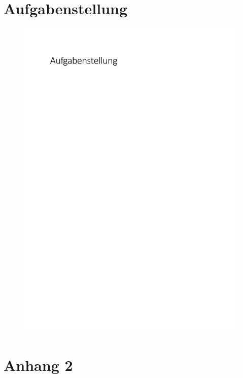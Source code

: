 \section{Aufgabenstellung}\label{sec:aufgabenstellung}
\begin{figure}[H]
\centering
\includegraphics[scale=0.6]{../ressources/Aufgabenstellung.pdf}
\end{figure}
\pagebreak
\section{Anhang 2}\label{sec:anhang_2}
\lipsum[1]